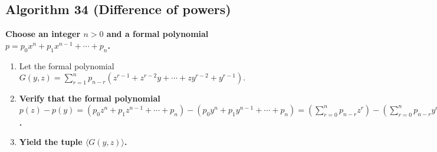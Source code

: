 \documentclass[twocolumn]{article}
\begin{document}
		\subsection{Algorithm 34 (Difference of powers)}\label{sec:algorithm 34}
			\textbf{Choose an integer $n>0$ and a formal polynomial $p=p_0x^n+p_1x^{n-1}+\cdots+p_n$.}
			\begin{enumerate}
				\item Let the formal polynomial $G(y,z)=\sum_{r=1}^n p_{n-r}(z^{r-1}+z^{r-2}y+\cdots+zy^{r-2}+y^{r-1})$.
				\item \textbf{Verify that the formal polynomial $p(z)-p(y)=(p_0z^n+p_1z^{n-1}+\cdots+p_n)-(p_0y^n+p_1y^{n-1}+\cdots+p_n)=(\sum_{r=0}^n p_{n-r}z^r)-(\sum_{r=0}^n p_{n-r}y^r)=\sum_{r=1}^n p_{n-r}(z^r-y^r)=\sum_{r=1}^n p_{n-r}(z-y)(z^{r-1}+z^{r-2}y+\cdots+zy^{r-2}+y^{r-1})=(z-y)\sum_{r=1}^n p_{n-r}(z^{r-1}+z^{r-2}y+\cdots+zy^{r-2}+y^{r-1})=(z-y)G(y,z)$.}
				\item \textbf{Yield the tuple $\langle G(y,z)\rangle$.}
			\end{enumerate}
\end{document}

